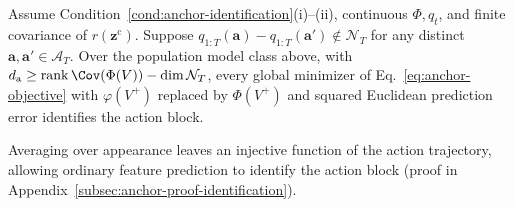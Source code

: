 \begin{corollary}
\label{cor:additive-anchor-learning}
Assume Condition~\ref{cond:anchor-identification}(i)--(ii), continuous
$\Phi,q_t$, and finite covariance of $r(\mathbf z^{\mathrm c})$.
Suppose $q_{1:T}(\mathbf a)-q_{1:T}(\mathbf a')\notin\mathcal N_T$
for any distinct $\mathbf a,\mathbf a'\in\mathcal A_T$.
Over the population model class above, with
$d_{\mathrm a}\geq\operatorname{rank}\Cov(\Phi(V))-\dim\mathcal N_T$,
every global minimizer of Eq.~\ref{eq:anchor-objective} with
$\varphi(V^+)$ replaced by $\Phi(V^+)$ and squared Euclidean prediction
error identifies the action block.
\end{corollary}

Averaging over appearance leaves an injective function of the action
trajectory, allowing ordinary feature prediction to identify the action
block (proof in Appendix~\ref{subsec:anchor-proof-identification}).
